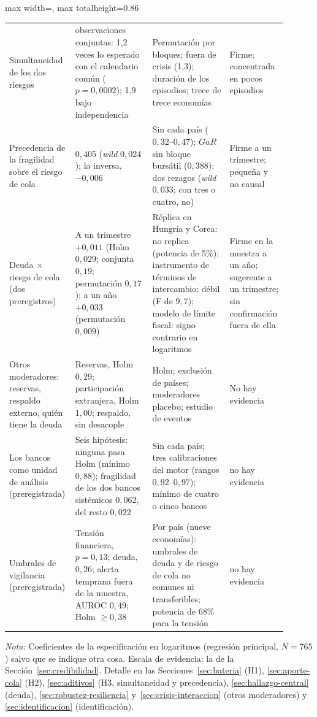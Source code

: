 \begin{table}[p]
\begin{adjustbox}{max width=\linewidth, max totalheight=0.86\textheight}
\begin{tabular}{>{\raggedright\arraybackslash}p{0.19\linewidth}>{\raggedright\arraybackslash}p{0.27\linewidth}>{\raggedright\arraybackslash}p{0.27\linewidth}>{\raggedright\arraybackslash}p{0.17\linewidth}}
\addlinespace
Simultaneidad de los dos riesgos & 168 observaciones conjuntas: 1,2 veces lo esperado con el calendario común ($p=0{,}0002$); 1,9 bajo independencia & Permutación por bloques; fuera de crisis (1,3); duración de los episodios; trece de trece economías & Firme; concentrada en pocos episodios \\
\addlinespace
Precedencia de la fragilidad sobre el riesgo de cola & $0{,}405$ (\textit{wild} $0{,}024$); la inversa, $-0{,}006$ & Sin cada país ($0{,}32$--$0{,}47$); $GaR$ sin bloque bursátil ($0{,}388$); dos rezagos (\textit{wild} $0{,}033$; con tres o cuatro, no) & Firme a un trimestre; pequeña y no causal \\
\addlinespace
Deuda $\times$ riesgo de cola (dos preregistros) & A un trimestre $+0{,}011$ (Holm $0{,}029$; conjunta $0{,}19$; permutación $0{,}17$); a un año $+0{,}033$ (permutación $0{,}009$) & Réplica en Hungría y Corea: no replica (potencia de 5\%); instrumento de términos de intercambio: débil (F de $9{,}7$); modelo de límite fiscal: signo contrario en logaritmos & Firme en la muestra a un año; sugerente a un trimestre; sin confirmación fuera de ella \\
\addlinespace
Otros moderadores: reservas, respaldo externo, quién tiene la deuda & Reservas, Holm $0{,}29$; participación extranjera, Holm $1{,}00$; respaldo, sin desacople & Holm; exclusión de países; moderadores placebo; estudio de eventos & No hay evidencia \\
\addlinespace
Los bancos como unidad de análisis (preregistrada) & Seis hipótesis: ninguna pasa Holm (mínimo $0{,}88$); fragilidad de los dos bancos sistémicos $0{,}062$, del resto $0{,}022$ & Sin cada país; tres calibraciones del motor (rangos $0{,}92$--$0{,}97$); mínimo de cuatro o cinco bancos & no hay evidencia \\
\addlinespace
Umbrales de vigilancia (preregistrada) & Tensión financiera, $p=0{,}13$; deuda, $0{,}26$; alerta temprana fuera de la muestra, AUROC $0{,}49$; Holm $\geq0{,}38$ & Por país (nueve economías): umbrales de deuda y de riesgo de cola no comunes ni transferibles; potencia de 68\% para la tensión & no hay evidencia \\
\bottomrule
\end{tabular}
\end{adjustbox}
\par\smallskip\parbox{0.95\linewidth}{\footnotesize \textit{Nota:} Coeficientes de la especificación en logaritmos (regresión principal, $N=765$) salvo que se indique otra cosa. Escala de evidencia: la de la Sección~\ref{sec:credibilidad}. Detalle en las Secciones~\ref{sec:bateria} (H1), \ref{sec:aporte-cola} (H2), \ref{sec:aditivos} (H3, simultaneidad y precedencia), \ref{sec:hallazgo-central} (deuda), \ref{sec:robustez-resiliencia} y~\ref{sec:crisis-interaccion} (otros moderadores) y \ref{sec:identificacion} (identificación).}
\end{table}

